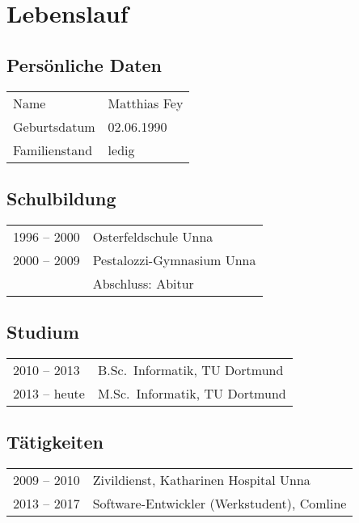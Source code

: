 \documentclass[10pt]{scrartcl}
\begin{document}
\section*{Lebenslauf}

\subsection*{Persönliche Daten}

\begin{tabular}{p{3cm}p{13cm}}
Name          & Matthias Fey\\
Geburtsdatum  & 02.06.1990\\
Familienstand & ledig\\
\end{tabular}

\subsection*{Schulbildung}

\begin{tabular}{p{3cm}p{13cm}}
1996 – 2000 & Osterfeldschule Unna\\
2000 – 2009 & Pestalozzi-Gymnasium Unna\\
            & Abschluss: Abitur\\
\end{tabular}

\subsection*{Studium}

\begin{tabular}{p{3cm}p{13cm}}
2010 – 2013  & B.Sc.\ Informatik, TU Dortmund\\
2013 – heute & M.Sc.\ Informatik, TU Dortmund\\
\end{tabular}

\subsection*{Tätigkeiten}

\begin{tabular}{p{3cm}p{13cm}}
2009 – 2010 & Zivildienst, Katharinen Hospital Unna\\
2013 – 2017 & Software-Entwickler (Werkstudent), Comline\\
\end{tabular}
\end{document}

